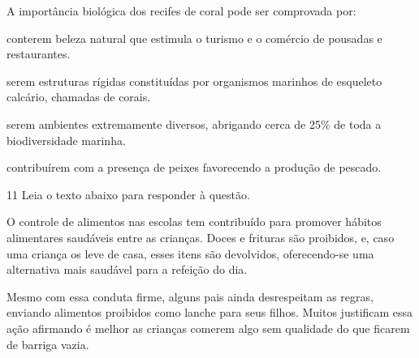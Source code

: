A importância biológica dos recifes de coral pode ser comprovada por:

\begin{escolha}
    
    \item conterem beleza natural que estimula o turismo e o comércio de
  pousadas e restaurantes.
    
    \item serem estruturas rígidas constituídas por organismos marinhos de
  esqueleto calcário, chamadas de corais.
    
    \item serem ambientes extremamente diversos, abrigando cerca de 25\% de
  toda a biodiversidade marinha.
    
    \item contribuírem com a presença de peixes favorecendo a produção de
  pescado.

\end{escolha}

\num{11} Leia o texto abaixo para responder à questão. 

\begin{myquote}



O controle de alimentos nas escolas tem contribuído para promover hábitos
alimentares saudáveis entre as crianças. Doces e frituras são proibidos, e,
caso uma criança os leve de casa, esses itens são devolvidos, oferecendo-se
uma alternativa mais saudável para a refeição do dia.

Mesmo com essa conduta firme, alguns pais ainda desrespeitam as regras,
enviando alimentos proibidos como lanche para seus filhos. Muitos justificam
essa ação afirmando é melhor as crianças comerem algo sem qualidade do que
ficarem de barriga vazia.


\end{myquote}

